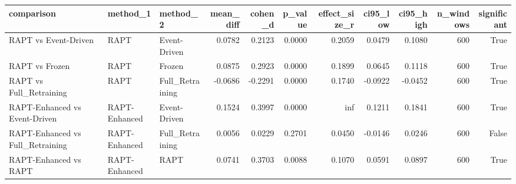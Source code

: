 \begin{tabular}{lllrrrrrrrr}
\toprule
comparison & method_1 & method_2 & mean_diff & cohen_d & p_value & effect_size_r & ci95_low & ci95_high & n_windows & significant \\
\midrule
RAPT vs Event-Driven & RAPT & Event-Driven & 0.0782 & 0.2123 & 0.0000 & 0.2059 & 0.0479 & 0.1080 & 600 & True \\
RAPT vs Frozen & RAPT & Frozen & 0.0875 & 0.2923 & 0.0000 & 0.1899 & 0.0645 & 0.1118 & 600 & True \\
RAPT vs Full_Retraining & RAPT & Full_Retraining & -0.0686 & -0.2291 & 0.0000 & 0.1740 & -0.0922 & -0.0452 & 600 & True \\
RAPT-Enhanced vs Event-Driven & RAPT-Enhanced & Event-Driven & 0.1524 & 0.3997 & 0.0000 & inf & 0.1211 & 0.1841 & 600 & True \\
RAPT-Enhanced vs Full_Retraining & RAPT-Enhanced & Full_Retraining & 0.0056 & 0.0229 & 0.2701 & 0.0450 & -0.0146 & 0.0246 & 600 & False \\
RAPT-Enhanced vs RAPT & RAPT-Enhanced & RAPT & 0.0741 & 0.3703 & 0.0088 & 0.1070 & 0.0591 & 0.0897 & 600 & True \\
\bottomrule
\end{tabular}
